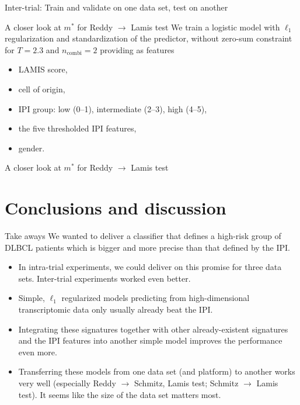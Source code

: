 \documentclass[10pt, aspectratio=169]{beamer}
\begin{document}
\begin{frame}{Inter-trial: Train and validate on one data set, test on another}
  
\end{frame}

\begin{frame}{A closer look at $m^*$ for Reddy $\to$ Lamis test}
  We train a logistic model with $\ell_1$ regularization and standardization of 
  the predictor, without zero-sum constraint for $T = \num{2.3}$ and 
  $n_\text{combi} = 2$ providing as features
  \begin{itemize}
    \item LAMIS score,
    \item cell of origin,
    \item IPI group: low (0--1), intermediate (2--3), high (4--5),
    \item the five thresholded IPI features,
    \item gender.
  \end{itemize}
\end{frame}

\begin{frame}{A closer look at $m^*$ for Reddy $\to$ Lamis test}
  
\end{frame}

\section{Conclusions and discussion}
\begin{frame}{Take aways}
  We wanted to deliver a classifier that defines a high-risk group of DLBCL 
  patients which is bigger and more precise than that defined by the IPI.
  \begin{itemize}
    \item In intra-trial experiments, we could deliver on this promise for three 
      data sets. Inter-trial experiments worked even better.
    \pause
    \item Simple, $\ell_1$ regularized models predicting from high-dimensional 
      transcriptomic data only usually already beat the IPI.
    \pause
    \item Integrating these signatures together with other already-existent 
      signatures and the IPI features into another simple model improves the 
      performance even more.
    \pause
    \item Transferring these models from one data set (and platform) to another
      works very well (especially Reddy $\to$ Schmitz, Lamis test; Schmitz $\to$ 
      Lamis test). It seems like the size of the data set matters most.
  \end{itemize}
\end{frame}
\end{document}
